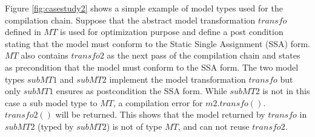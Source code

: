 Figure \ref{fig:casestudy2} shows a simple example of model types used for the compilation chain. 
Suppose that the abstract model transformation $\mathit{transfo}$ defined in $MT$ is used for optimization purpose and define a post condition stating that the model must conform to the Static Single Assignment (SSA) form. $MT$ also contains $\mathit{transfo2}$ as the next pass of the compilation chain and states as precondition that the model must conform to the SSA form. 
The two model types $subMT1$ and $subMT2$ implement the model transformation $\mathit{transfo}$ but only $subMT1$ ensures as postcondition the SSA form. While $subMT2$ is not in this case a sub model type to $MT$, a compilation error for $m2.$$\mathit{transfo}().$$\mathit{transfo}2()$ will be returned. This shows that the model returned by $\mathit{transfo}$ in $subMT2$ (typed by $subMT2$) is not of type $MT$, and can not reuse $\mathit{transfo2}$.
